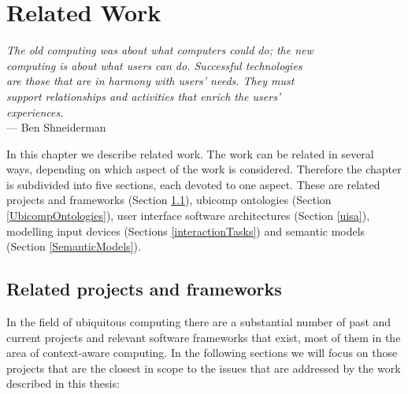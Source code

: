 \chapter{Related Work}

\begin{flushright}{\slshape
The old computing was about what computers could do; the new \\
computing is about what users can do. Successful technologies\\
are those that are in harmony with users' needs. They must \\
support relationships and activities that enrich the users' \\
experiences. } \\ \medskip
	    --- Ben Shneiderman
	\end{flushright}

In this chapter we describe related work. The work can be related in several ways, depending on which aspect of the work is considered. Therefore the chapter is subdivided into five sections, each devoted to one aspect. These are related projects and frameworks (Section \ref{RelatedProjects}), ubicomp ontologies (Section \ref{UbicompOntologies}), user interface software architectures (Section \ref{uisa}), modelling input devices (Sections \ref{interactionTasks}) and semantic models (Section \ref{SemanticModels}).


\section{Related projects and frameworks}
\label{RelatedProjects}
% 
% 

In the field of ubiquitous computing there are a substantial number of past and current projects and relevant software frameworks that exist, most of them in the area of context-aware computing. In the following sections we will focus on those projects that are the closest in scope to the issues that are addressed by the work described in this thesis:

